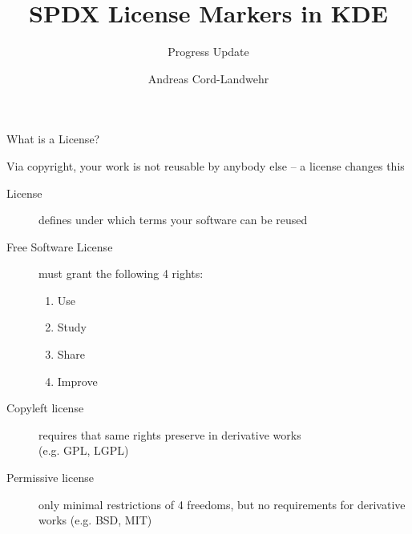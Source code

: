 \documentclass[t,compress,aspectratio=169]{beamer}
\title{SPDX License Markers in KDE}
\subtitle{Progress Update}
\author{Andreas Cord-Landwehr}
\begin{document}
\begin{withoutheadline}
\begin{frame}
\titlepage
\end{frame}
\end{withoutheadline}


\begin{frame}
    {What is a License?}

    Via copyright, your work is not reusable by anybody else -- a license changes this

    \begin{description}
        \item [License] defines under which terms your software can be reused
        \item [Free Software License] must grant the following 4 rights:
            \begin{enumerate}
                \item Use
                \item Study
                \item Share
                \item Improve
            \end{enumerate}
        \item [Copyleft license] requires that same rights preserve in derivative works\\ (e.g. GPL, LGPL)
        \item [Permissive license] only minimal restrictions of 4 freedoms, but no requirements for derivative works (e.g. BSD, MIT)
    \end{description}
\end{frame}
\end{document}
